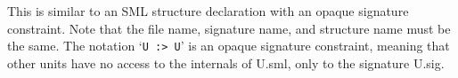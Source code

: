\documentclass[fleqn,a4paper]{article}
\begin{document}
\noindent This is similar to an SML structure declaration with an
opaque signature constraint.  Note that the file name, signature name,
and structure name must be the same.  The notation `{\tt U :> U}' is
an opaque signature constraint, meaning that other units have no
access to the internals of U.sml, only to the signature U.sig.










\end{document}
